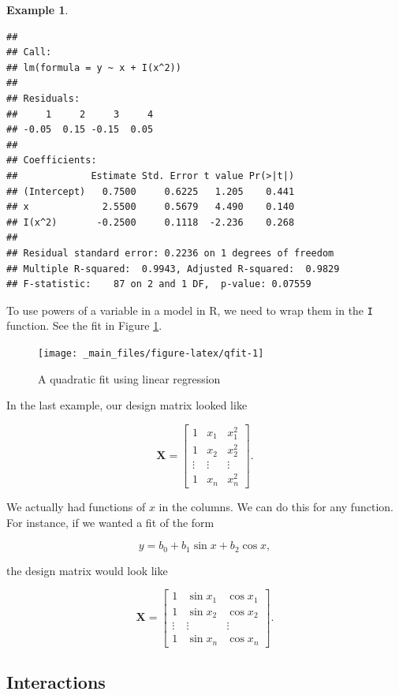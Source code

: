 \documentclass[
]{book}
\theoremstyle{definition}
\theoremstyle{definition}
\newtheorem{example}{Example}[chapter]
\theoremstyle{definition}
\theoremstyle{definition}
\theoremstyle{remark}
\begin{document}
\begin{examplebox}
\begin{example}
\begin{verbatim}
## 
## Call:
## lm(formula = y ~ x + I(x^2))
## 
## Residuals:
##     1     2     3     4 
## -0.05  0.15 -0.15  0.05 
## 
## Coefficients:
##             Estimate Std. Error t value Pr(>|t|)
## (Intercept)   0.7500     0.6225   1.205    0.441
## x             2.5500     0.5679   4.490    0.140
## I(x^2)       -0.2500     0.1118  -2.236    0.268
## 
## Residual standard error: 0.2236 on 1 degrees of freedom
## Multiple R-squared:  0.9943, Adjusted R-squared:  0.9829 
## F-statistic:    87 on 2 and 1 DF,  p-value: 0.07559
\end{verbatim}

To use powers of a variable in a model in R, we need to wrap them in the \texttt{I} function. See the fit in Figure \ref{fig:qfit}.
\end{example}

\end{examplebox}

\begin{figure}

{\centering \texttt{[image: \_main\_files/figure-latex/qfit-1]} 

}

\caption{A quadratic fit using linear regression}\label{fig:qfit}
\end{figure}

In the last example, our design matrix looked like

\[\mathbf{X}=\begin{bmatrix} 1& x_1 & x_1^2 \\1 & x_2 & x_2^2\\ \vdots & \vdots & \vdots \\ 1 & x_n & x_n^2\end{bmatrix}.\]

We actually had functions of \(x\) in the columns. We can do this for any function. For instance, if we wanted a fit of the form

\[y=b_0 +b_1\sin x+b_2\cos x,\]

the design matrix would look like

\[\mathbf{X}=\begin{bmatrix}1 & \sin x_1 & \cos x_1\\1 & \sin x_2 & \cos x_2 \\ \vdots & \vdots & \vdots \\
1 & \sin x_n & \cos x_n\end{bmatrix}.\]

\subsection*{Interactions}\label{interactions}
\end{document}
